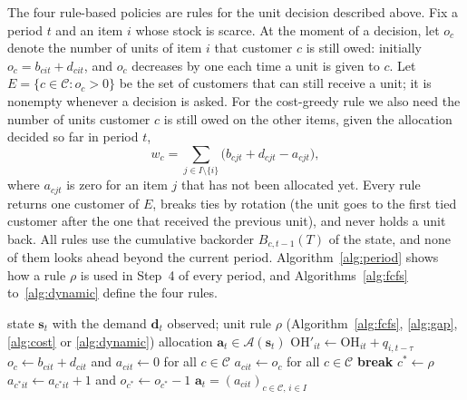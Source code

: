 \documentclass[11pt, a4paper]{article}
\theoremstyle{definition}
\theoremstyle{remark}
\newcommand{\OH}{\text{OH}}
\begin{document}
The four rule-based policies are rules for the unit decision described above. Fix a period $t$ and an item $i$ whose stock is scarce. At the moment of a decision, let $o_c$ denote the number of units of item $i$ that customer $c$ is still owed: initially $o_c = b_{cit} + d_{cit}$, and $o_c$ decreases by one each time a unit is given to $c$. Let $E = \{c \in \mathcal{C} : o_c > 0\}$ be the set of customers that can still receive a unit; it is nonempty whenever a decision is asked. For the cost-greedy rule we also need the number of units customer $c$ is still owed on the other items, given the allocation decided so far in period $t$,
\begin{equation}
    w_c = \sum_{j \in I \setminus \{i\}} \big(b_{cjt} + d_{cjt} - a_{cjt}\big),
\end{equation}
where $a_{cjt}$ is zero for an item $j$ that has not been allocated yet. Every rule returns one customer of $E$, breaks ties by rotation (the unit goes to the first tied customer after the one that received the previous unit), and never holds a unit back. All rules use the cumulative backorder $B_{c,t-1}(T)$ of the state, and none of them looks ahead beyond the current period. Algorithm~\ref{alg:period} shows how a rule $\rho$ is used in Step~4 of every period, and Algorithms~\ref{alg:fcfs} to~\ref{alg:dynamic} define the four rules.

\begin{algorithm}[H]
\caption{Allocation in period $t$ with a unit rule $\rho$ (Step 4)}
\label{alg:period}
\begin{algorithmic}[1]
\Require state $\mathbf{s}_t$ with the demand $\mathbf{d}_t$ observed; unit rule $\rho$ (Algorithm~\ref{alg:fcfs}, \ref{alg:gap}, \ref{alg:cost} or \ref{alg:dynamic})
\Ensure allocation $\mathbf{a}_t \in \mathcal{A}(\mathbf{s}_t)$
    \State $\OH'_{it} \gets \OH_{it} + q_{i,t-\tau}$
    \State $o_c \gets b_{cit} + d_{cit}$ and $a_{cit} \gets 0$ for all $c \in \mathcal{C}$
    \If{$\sum_{c \in \mathcal{C}} o_c \leq \OH'_{it}$}
        \State $a_{cit} \gets o_c$ for all $c \in \mathcal{C}$ 
    \Else
        \For{$u = 1, \ldots, \OH'_{it}$} 
                \State \textbf{break}
            \EndIf
            \State $c^{*} \gets \rho$ 
            \State $a_{c^{*}it} \gets a_{c^{*}it} + 1$ and $o_{c^{*}} \gets o_{c^{*}} - 1$
        \EndFor
    \EndIf
\EndFor
\State \Return $\mathbf{a}_t = (a_{cit})_{c \in \mathcal{C},\, i \in I}$
\end{algorithmic}
\end{algorithm}
\end{document}
